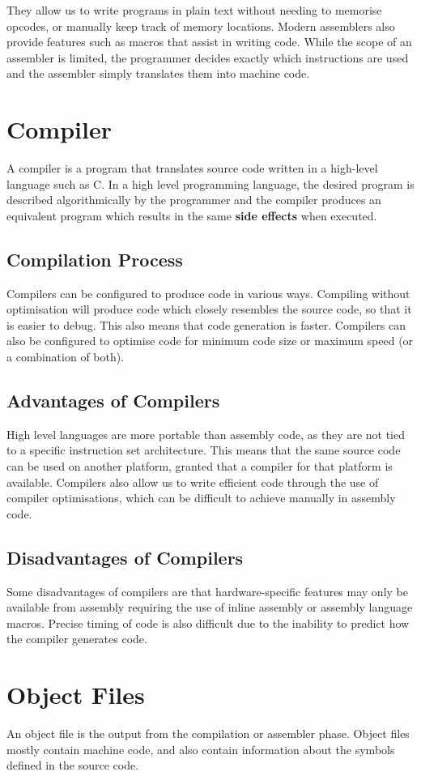 \documentclass[a4paper]{report}
\begin{document}
They allow us to write programs in plain text without needing to memorise opcodes,
or manually keep track of memory locations. Modern assemblers also provide features
such as macros that assist in writing code. While the scope of an assembler is
limited, the programmer decides exactly which instructions are used and the
assembler simply translates them into machine code.
\section{Compiler}
A compiler is a program that translates source code written in a high-level language
such as C. In a high level programming language, the desired program is described
algorithmically by the programmer and the compiler produces an equivalent program
which results in the same \textbf{side effects} when executed.
\subsection{Compilation Process}
Compilers can be configured to produce code in various ways. Compiling without
optimisation will produce code which closely resembles the source code, so that it is easier to debug.
This also means that code generation is faster. Compilers can also be configured to
optimise code for minimum code size or maximum speed (or a combination of both).
\subsection{Advantages of Compilers}
High level languages are more portable than assembly code, as they are not tied to a specific instruction set
architecture. This means that the same source code can be used on another platform, granted
that a compiler for that platform is available. Compilers also allow us to write efficient code
through the use of compiler optimisations, which can be difficult to achieve manually in assembly code.
\subsection{Disadvantages of Compilers}
Some disadvantages of compilers are that hardware-specific features may only be available from assembly
requiring the use of inline assembly or assembly language macros. Precise timing of code is also difficult
due to the inability to predict how the compiler generates code.
\section{Object Files}
An object file is the output from the compilation or assembler phase.
Object files mostly contain machine code, and also contain information about
the symbols defined in the source code.
\end{document}
